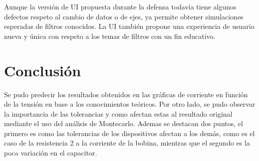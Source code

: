 \documentclass[a4paper]{article}
\begin{document}
Aunque la versión de UI propuesta durante la defensa todavía tiene algunos defectos respeto al cambio de datos o de ejes, ya permite obtener simulaciones esperadas de filtros conocidos. La UI también propone una experiencia de usuario nueva y única con respeto a los temas de filtros con un fin educativo.

\section*{Conclusión}

Se pudo predecir los resultados obtenidos en las gráficas de corriente en función de la tensión en base a los conocimientos teóricos. Por otro lado, se pudo observar la importancia de las tolerancias y como afectan estas al resultado original mediante el uso del análisis de Montecarlo. Ademas se destacan dos puntos, el primero es como las tolerancias de los dispositivos afectan a los demás, como es el caso de la resistencia 2 a la corriente de la bobina, mientras que el segundo es la poca variación en el capacitor. 
\end{document}
